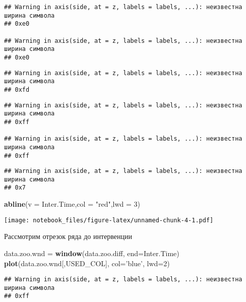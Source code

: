 \documentclass[
]{article}
\newenvironment{Shaded}{\begin{snugshade}}{\end{snugshade}}
\newcommand{\DataTypeTok}[1]{\textcolor[rgb]{0.13,0.29,0.53}{#1}}
\newcommand{\DecValTok}[1]{\textcolor[rgb]{0.00,0.00,0.81}{#1}}
\newcommand{\KeywordTok}[1]{\textcolor[rgb]{0.13,0.29,0.53}{\textbf{#1}}}
\newcommand{\NormalTok}[1]{#1}
\newcommand{\StringTok}[1]{\textcolor[rgb]{0.31,0.60,0.02}{#1}}
\begin{document}
\begin{verbatim}
## Warning in axis(side, at = z, labels = labels, ...): неизвестна ширина символа
## 0xe0

## Warning in axis(side, at = z, labels = labels, ...): неизвестна ширина символа
## 0xe0
\end{verbatim}

\begin{verbatim}
## Warning in axis(side, at = z, labels = labels, ...): неизвестна ширина символа
## 0xfd
\end{verbatim}

\begin{verbatim}
## Warning in axis(side, at = z, labels = labels, ...): неизвестна ширина символа
## 0xff

## Warning in axis(side, at = z, labels = labels, ...): неизвестна ширина символа
## 0xff
\end{verbatim}

\begin{verbatim}
## Warning in axis(side, at = z, labels = labels, ...): неизвестна ширина символа
## 0x7
\end{verbatim}

\begin{Shaded}
\begin{Highlighting}[]
\KeywordTok{abline}\NormalTok{(}\DataTypeTok{v =}\NormalTok{ Inter.Time,}\DataTypeTok{col =} \StringTok{"red"}\NormalTok{,}\DataTypeTok{lwd =} \DecValTok{3}\NormalTok{)}
\end{Highlighting}
\end{Shaded}

\texttt{[image: notebook\_files/figure-latex/unnamed-chunk-4-1.pdf]}

Рассмотрим отрезок ряда до интервенции

\begin{Shaded}
\begin{Highlighting}[]
\NormalTok{data.zoo.wnd =}\StringTok{ }\KeywordTok{window}\NormalTok{(data.zoo.diff, }\DataTypeTok{end=}\NormalTok{Inter.Time)}
\KeywordTok{plot}\NormalTok{(data.zoo.wnd[,USED_COL], }\DataTypeTok{col=}\StringTok{'blue'}\NormalTok{, }\DataTypeTok{lwd=}\DecValTok{2}\NormalTok{)}
\end{Highlighting}
\end{Shaded}

\begin{verbatim}
## Warning in axis(side, at = z, labels = labels, ...): неизвестна ширина символа
## 0xff
\end{verbatim}
\end{document}
